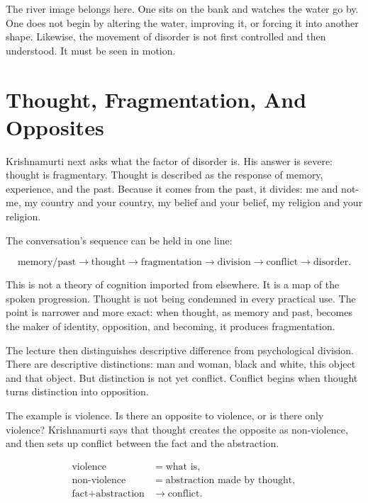 The river image belongs here. One sits on the bank and watches the water go by. One does not begin by altering the water, improving it, or forcing it into another shape. Likewise, the movement of disorder is not first controlled and then understood. It must be seen in motion.

\section{Thought, Fragmentation, And Opposites}

Krishnamurti next asks what the factor of disorder is. His answer is severe: thought is fragmentary. Thought is described as the response of memory, experience, and the past. Because it comes from the past, it divides: me and not-me, my country and your country, my belief and your belief, my religion and your religion.

The conversation's sequence can be held in one line:

\begin{equation}
\text{memory/past}
\longrightarrow
\text{thought}
\longrightarrow
\text{fragmentation}
\longrightarrow
\text{division}
\longrightarrow
\text{conflict}
\longrightarrow
\text{disorder}.
\end{equation}

This is not a theory of cognition imported from elsewhere. It is a map of the spoken progression. Thought is not being condemned in every practical use. The point is narrower and more exact: when thought, as memory and past, becomes the maker of identity, opposition, and becoming, it produces fragmentation.

The lecture then distinguishes descriptive difference from psychological division. There are descriptive distinctions: man and woman, black and white, this object and that object. But distinction is not yet conflict. Conflict begins when thought turns distinction into opposition.

The example is violence. Is there an opposite to violence, or is there only violence? Krishnamurti says that thought creates the opposite as non-violence, and then sets up conflict between the fact and the abstraction.

\begin{align}
\text{violence} &= \text{what is},\\
\text{non-violence} &= \text{abstraction made by thought},\\
\text{fact}+\text{abstraction} &\longrightarrow \text{conflict}.
\end{align}


